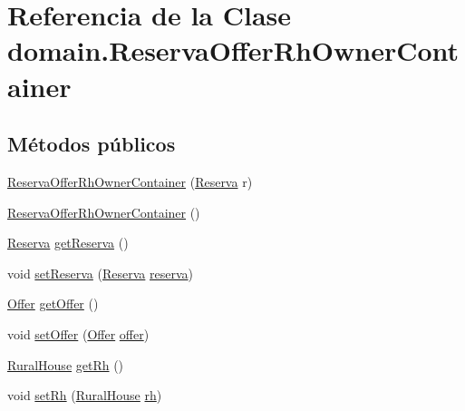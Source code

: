 \hypertarget{classdomain_1_1_reserva_offer_rh_owner_container}{}\section{Referencia de la Clase domain.\+Reserva\+Offer\+Rh\+Owner\+Container}
\label{classdomain_1_1_reserva_offer_rh_owner_container}
\subsection*{Métodos públicos}
\begin{DoxyCompactItemize}
\item 
\mbox{\hyperlink{classdomain_1_1_reserva_offer_rh_owner_container_a8dd8e74751c3687311a3dc879bf4ec1c}{Reserva\+Offer\+Rh\+Owner\+Container}} (\mbox{\hyperlink{classdomain_1_1_reserva}{Reserva}} r)
\item 
\mbox{\hyperlink{classdomain_1_1_reserva_offer_rh_owner_container_ad9d429d5bde3581517b0029a825aefb6}{Reserva\+Offer\+Rh\+Owner\+Container}} ()
\item 
\mbox{\hyperlink{classdomain_1_1_reserva}{Reserva}} \mbox{\hyperlink{classdomain_1_1_reserva_offer_rh_owner_container_aac4cc25208d928d5a68f72611c64fc3e}{get\+Reserva}} ()
\item 
void \mbox{\hyperlink{classdomain_1_1_reserva_offer_rh_owner_container_a756c562dcce796edc2fc9a6c395fac80}{set\+Reserva}} (\mbox{\hyperlink{classdomain_1_1_reserva}{Reserva}} \mbox{\hyperlink{classdomain_1_1_reserva_offer_rh_owner_container_afcbc4f46e44afcfe5f441462b8628198}{reserva}})
\item 
\mbox{\hyperlink{classdomain_1_1_offer}{Offer}} \mbox{\hyperlink{classdomain_1_1_reserva_offer_rh_owner_container_af4089b377fb75d45f5178ddcb13d244d}{get\+Offer}} ()
\item 
void \mbox{\hyperlink{classdomain_1_1_reserva_offer_rh_owner_container_a9bde23e4776b3ab5f1a3ca0c2383eec1}{set\+Offer}} (\mbox{\hyperlink{classdomain_1_1_offer}{Offer}} \mbox{\hyperlink{classdomain_1_1_reserva_offer_rh_owner_container_ad8659a141937db6a13a2afc94ee10302}{offer}})
\item 
\mbox{\hyperlink{classdomain_1_1_rural_house}{Rural\+House}} \mbox{\hyperlink{classdomain_1_1_reserva_offer_rh_owner_container_ae420b93f550cdc6ce38e896b1371e051}{get\+Rh}} ()
\item 
void \mbox{\hyperlink{classdomain_1_1_reserva_offer_rh_owner_container_a99a20474815a9663239605aa3b5ca2ce}{set\+Rh}} (\mbox{\hyperlink{classdomain_1_1_rural_house}{Rural\+House}} \mbox{\hyperlink{classdomain_1_1_reserva_offer_rh_owner_container_a96ee8f1952c3b10e5ca8cbf71fdf95cf}{rh}})

\end{DoxyCompactItemize}
